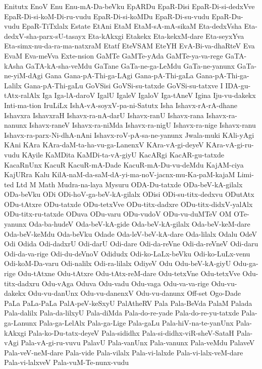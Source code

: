 {Enitutx
EnoV
Enu
Enu-mA-Da-beVku
EpARDu
EpaR-Disi
EpaR-Di-si-dedxVve
EpaR-Di-si-koM-Di-ru-vudu
EpaR-Di-si-koMDu
EpaR-Di-su-vudu
EpaR-Du-vudu
EpaR-TiTxlalx
Estate
EtAni
EtaM
EtaM-sA-mA-sikaM
Eta-dedxVsha
Eta-dedxV-sha-parx-sU-tasayx
Eta-kAkxgi
Etakekx
Eta-kekxM-dare
Eta-seyxYva
Eta-simx-nu-da-ra-ma-natxraM
Etatf
EteVSAM
EteYH
EvA-Bi-va-dhaRteV
Eva
EvaM
Eva-meVva
Exte-nsion
GaMTe
GaMTe-yAda
GaMTe-ya-va-rege
GaTA-kAsha
GaTA-kA-sha-veMdu
GaTane
GaTa-ne-ga-LeMdu
GaTa-ne-yanunx
GaTa-ne-yiM-dAgi
Gana
Gana-pA-Thi-ga-LAgi
Gana-pA-Thi-gaLa
Gana-pA-Thi-ga-Lalilx
Gana-pA-Thi-gaLu
GoVSisi
GoVSi-su-tatxde
GoVSi-su-tatxve
I
IDA-gu-tAtx-ralAlx
Iga
Iga-lA-daroV
IgalU
IgaleV
IgaloV
Iga-tAneV
Igina
Iju-vu-dakekx
Inti-ma-tion
IruLiLx
IshA-vA-soyxV-pa-ni-Satutx
Isha
Ishavx-rA-rA-dhane
Ishavxra
IshavxraH
Ishavx-ra-nA-darU
Ishavx-ranU
Ishavx-rana
Ishavx-ra-nanunx
Ishavx-raneV
Ishavx-ra-niMda
Ishavx-ra-nigU
Ishavx-ra-nige
Ishavx-ranu
Ishavx-ra-parx-Ni-dhA-nAni
Ishavx-roV-pA-sa-ne-yanunx
Jwala-muki
KAli-yAgi
KAni
KAra
KAra-daM-ta-ha-vu-ga-LanenxV
KAra-vA-gi-deyeV
KAra-vA-gi-ru-vudu
KAyile
KaMDita
KaMDi-ta-vA-giyU
KacARgi
KacAR-gu-tatxde
KacaRnUnx
KacuR
KacuR-mA-Dade
KacuR-mA-Du-vu-deMdu
KajAM-ciya
KajURra
Kalu
KilA-naM-da-saM-dA-yi-ma-noV-jacnx-mu-Ka-paM-kajaM
Limi-ted
Ltd
M
Math
Mudra-na-laya
Mysuru
ODA-Du-tatxde
ODa-beV-kA-gilalx
ODa-beVku
ODi
ODi-hoV-ga-beV-kA-gilalx
ODisi
ODi-su-titx-dedxvu
ODutAtx
ODu-tAtxre
ODu-tatxde
ODu-tetxVve
ODu-titx-dadxre
ODu-titx-didxV-yalAlx
ODu-titx-ru-tatxde
ODuva
ODu-varu
ODu-vudoV
ODu-vu-duMTeV
OM
OTe-yanunx
Oda-ba-hudeV
Oda-beV-kA-gide
Oda-beV-kA-gilalx
Oda-beV-keM-dare
Oda-beV-keMdu
Oda-beVku
Odade
Oda-leV-beV-kA-dare
Oda-lilalx
Odalu
OdeV
Odi
Odida
Odi-dadxrU
Odi-darU
Odi-dare
Odi-da-reVne
Odi-da-reVneV
Odi-daru
Odi-da-va-rige
Odi-du-deVnoV
Odidudx
Odi-ko-LaLx-beVku
Odi-ko-LuLx-venu
Odi-koM-Da-varu
Odi-nalilx
Odi-ra-lilalx
OdiyeV
Odu
Odu-beV-kA-giyU
Odu-ga-rige
Odu-tAtxne
Odu-tAtxre
Odu-tAtx-reM-dare
Odu-tetxVne
Odu-tetxVve
Odu-titx-dadxru
Odu-vAga
Oduva
Odu-vadu
Odu-vaga
Odu-va-va-rige
Odu-vu-dakekx
Odu-vu-danUnx
Odu-vu-danenxV
Odu-vu-danunx
Off-set
Ogo-Dade
PaLa
PaLa-PaLa
PalA-peV-keSxyU
PalAtheRV
Pala
Pala-BeVda
PalaM
Palada
Pala-dalilx
Pala-da-lilxyU
Pala-diMda
Pala-do-re-yade
Pala-do-re-yu-tatxde
Pala-ga-Lanunx
Pala-ga-LelAlx
Pala-ga-Lige
Pala-gaLu
Pala-hiV-na-te-yanUnx
Pala-kAkxgi
Pala-ko-Du-tatx-deyeV
Pala-sididhx
Pala-si-didhx-viR-sheV-SataH
Pala-vAgi
Pala-vA-gi-ru-vuvu
PalavU
Pala-vanUnx
Pala-vanunx
Pala-veMdu
PalaveV
Pala-veV-neM-dare
Pala-vide
Pala-vilalx
Pala-vi-lalxde
Pala-vi-lalx-veM-dare
Pala-vi-lalxveV
Pala-vuM-Te-nunx-vudu
}

